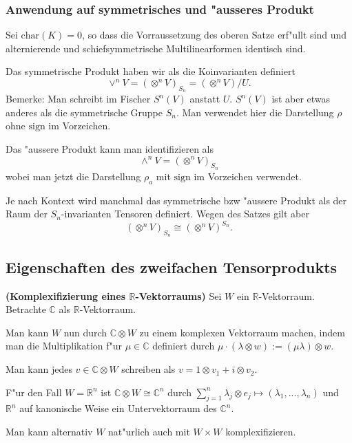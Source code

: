 \documentclass[8pt, a4paper, twocolumn, landscape]{article}
\begin{document}
{%
\subsubsection{Anwendung auf symmetrisches und "ausseres Produkt}
Sei $\mathrm{char}(K) = 0$, so dass die Vorraussetzung des oberen Satze erf"ullt sind und alternierende und schiefsymmetrische Multilinearformen identisch sind. 
\begin{remark}
Das symmetrische Produkt haben wir als die Koinvarianten definiert
$$
\vee^nV = (\otimes^n V)_{S_n} = (\otimes^n V) / U.
$$
Bemerke: Man schreibt im Fischer $S^n(V)$ anstatt $U$. $S^n(V)$ ist aber etwas anderes als die symmetrische Gruppe $S_n$.
Man verwendet hier die Darstellung $\rho$ ohne $\mathrm{sign}$ im Vorzeichen.
\end{remark}

\begin{remark}
Das "aussere Produkt kann man identifizieren als 
$$
\wedge^n V = (\otimes^nV)_{S_n}
$$
wobei man jetzt die Darstellung $\rho_a$ mit $\mathrm{sign}$ im Vorzeichen verwendet.
\end{remark}

\begin{remark}
Je nach Kontext wird manchmal das symmetrische bzw "aussere Produkt als der Raum der $S_n$-invarianten Tensoren definiert. Wegen des Satzes gilt aber
$$
(\otimes^n V)_{S_n} \cong (\otimes^n V)^{S_n}.
$$
\end{remark}

}

\subsection{Eigenschaften des zweifachen Tensorprodukts}


\begin{example}\textbf{(Komplexifizierung eines $\mathbb{R}$-Vektorraums)}
Sei $W$ ein $\mathbb{R}$-Vektorraum. Betrachte $\mathbb{C}$ als $\mathbb{R}$-Vektorraum. 

Man kann $W$ nun durch $\mathbb{C} \otimes W$ zu einem komplexen Vektorraum machen, indem man die Multiplikation f"ur $\mu \in \mathbb{C}$ definiert durch $\mu \cdot (\lambda \otimes w) := (\mu \lambda ) \otimes w$.

Man kann  jedes $v \in \mathbb{C} \otimes W$ schreiben als $v = 1 \otimes v_1 + i \otimes v_2$.

F"ur den Fall $W = \mathbb{R}^n$  ist $\mathbb{C} \otimes W \cong \mathbb{C}^n$ durch $\sum\limits_{j=1}^n \lambda_j \otimes e_j \mapsto (\lambda_1, ..., \lambda_n)$ und $\mathbb{R}^n $ auf kanonische Weise ein Untervektorraum des $\mathbb{C}^n$. 

Man kann alternativ $W$ nat"urlich auch mit $W\times W$ komplexifizieren.
\end{example}
\end{document}
